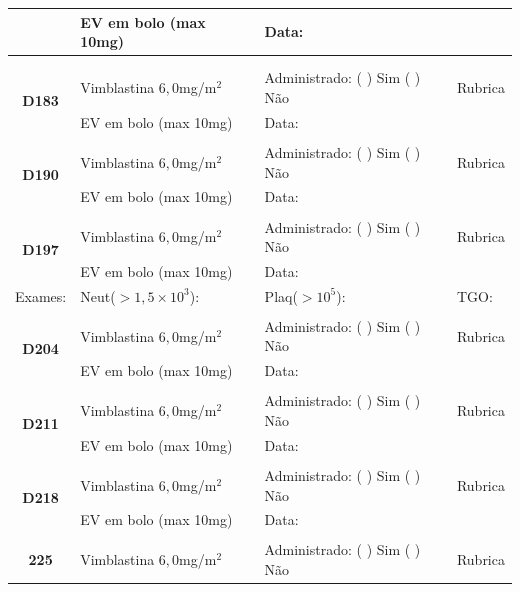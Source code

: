 \documentclass[11pt,a4paper,oldfontcommands]{memoir}
\begin{document}
\begin{center}
\begin{longtable}{p{1cm}p{5cm}|p{5cm}|p{3cm}}
    \multicolumn{1}{c|}{}&{EV em bolo (max 10mg)}&{Data:}&\\
    \hline\\[0.5cm]
    \\
    \hline
    \multicolumn{1}{c|}{\multirow{2}{*}{\textbf{D183}}}&{Vimblastina \(6,0\)mg/m\(^2\)}&{Administrado: (  ) Sim (  ) Não}&{Rubrica}\\
    \multicolumn{1}{c|}{}&{EV em bolo (max 10mg)}&{Data:}&\\
    \hline
    \\
    \hline
    \multicolumn{1}{c|}{\multirow{2}{*}{\textbf{D190}}}&{Vimblastina \(6,0\)mg/m\(^2\)}&{Administrado: (  ) Sim (  ) Não}&{Rubrica}\\
    \multicolumn{1}{c|}{}&{EV em bolo (max 10mg)}&{Data:}&\\
    \hline
    \\
    \hline
    \multicolumn{1}{c|}{\multirow{2}{*}{\textbf{D197}}}&{Vimblastina \(6,0\)mg/m\(^2\)}&{Administrado: (  ) Sim (  ) Não}&{Rubrica}\\
    \multicolumn{1}{c|}{}&{EV em bolo (max 10mg)}&{Data:}&\\
    \hline
    {\tiny{Exames:}}&{\tiny{Neut(\(>1,5\times10^3\)):}}&{\tiny{Plaq(\(>10^5\)):}}&{\tiny{TGO:}}
    \\
    \hline
    \\
    \hline
    \multicolumn{1}{c|}{\multirow{2}{*}{\textbf{D204}}}&{Vimblastina \(6,0\)mg/m\(^2\)}&{Administrado: (  ) Sim (  ) Não}&{Rubrica}\\
    \multicolumn{1}{c|}{}&{EV em bolo (max 10mg)}&{Data:}&\\
    \hline
    \\
    \hline
    \multicolumn{1}{c|}{\multirow{2}{*}{\textbf{D211}}}&{Vimblastina \(6,0\)mg/m\(^2\)}&{Administrado: (  ) Sim (  ) Não}&{Rubrica}\\
    \multicolumn{1}{c|}{}&{EV em bolo (max 10mg)}&{Data:}&\\
    \hline
    \\
    \hline
    \multicolumn{1}{c|}{\multirow{2}{*}{\textbf{D218}}}&{Vimblastina \(6,0\)mg/m\(^2\)}&{Administrado: (  ) Sim (  ) Não}&{Rubrica}\\
    \multicolumn{1}{c|}{}&{EV em bolo (max 10mg)}&{Data:}&\\
    \hline
    \\
    \hline
    \multicolumn{1}{c|}{\multirow{2}{*}{\textbf{225}}}&{Vimblastina \(6,0\)mg/m\(^2\)}&{Administrado: (  ) Sim (  ) Não}&{Rubrica}\\

\end{longtable}
\end{center}
\end{document}

